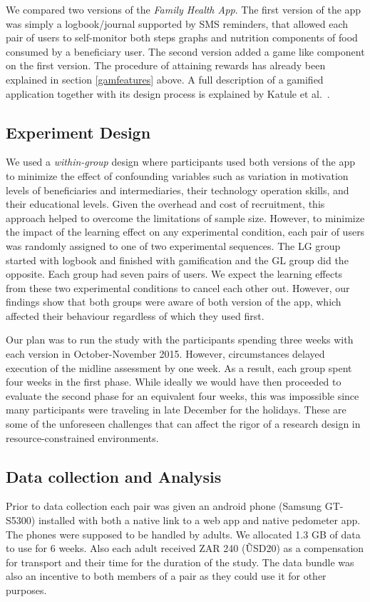 \documentclass{sig-alternate}
\begin{document}
We compared two versions of the \emph{Family Health App}. The first version of the app was simply a logbook/journal supported by SMS reminders, that allowed each pair of users to self-monitor both steps graphs and nutrition components of food consumed by a beneficiary user. The second version added a game like component on the first version. The procedure of attaining rewards has already been explained in section \ref{gamfeatures} above. A full description of a gamified application together with its design process is explained by Katule et al.~\cite{katule2016:leveraging}.
\subsection{Experiment Design}
We used a \emph{within-group} design where participants used both versions of the app to minimize the effect of confounding variables such as variation in motivation levels of beneficiaries and intermediaries, their technology operation skills, and their educational levels. Given the overhead and cost of recruitment, this approach helped to overcome the limitations of sample size. However, to minimize the impact of the learning effect on any experimental condition, each pair of users was randomly assigned to one of two experimental sequences. The LG group started with logbook and finished with gamification and the GL group did the opposite. Each group had seven pairs of users. We expect the learning effects from these two experimental conditions to cancel each other out.  However, our findings show that both groups were aware of both version of the app, which affected their behaviour regardless of which they used first. 

Our plan was to run the study with the participants spending three weeks with each version in October-November 2015. However, circumstances delayed execution of the midline assessment by one week. As a result, each group spent four weeks in the first phase.  While ideally we would have then proceeded to evaluate the second phase for an equivalent four weeks, this was impossible since many participants were traveling in late December for the holidays. These are some of the unforeseen challenges that can affect the rigor of a research design in resource-constrained environments.  

\subsection{Data collection and Analysis} 
Prior to data collection each pair was given an android phone (Samsung
GT-S5300) installed with both a native link to a web app and native pedometer app. The phones were supposed to be handled by adults. We allocated 1.3 GB of data to use for 6 weeks. Also each adult received ZAR 240 (\~USD20) as a compensation for transport and their time for the duration of the study. The data bundle was also an incentive to both members of a pair as they could use it for other purposes. 
\end{document}
